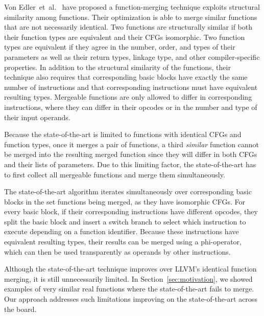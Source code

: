 Von Edler~et~al.~\cite{edler14} have proposed a function-merging technique exploits structural similarity among functions.
Their optimization is able to merge similar functions that are not necessarily
identical.
Two functions are structurally similar if both their function types are equivalent
and their CFGs isomorphic.
Two function types are equivalent if they agree in the number, order, and types
of their parameters as well as
their return types, linkage type, and other compiler-specific properties.
In addition to the structural similarity of the functions, their technique also
requires that corresponding basic blocks have exactly the same number of instructions
and that corresponding instructions must have equivalent resulting types.
Mergeable functions are only allowed to differ in corresponding instructions,
where they can differ in their opcodes or in the number and type of their input operands.


Because the state-of-the-art is limited to functions with identical CFGs
and function types, once it merges a pair of functions, a third
\textit{similar} function cannot be merged into the resulting merged function
since they will differ in both CFGs and their lists of parameters.
Due to this limiting factor, the state-of-the-art has to first collect all
mergeable functions and merge them simultaneously.

The state-of-the-art algorithm iterates simultaneously over corresponding basic
blocks in the set functions being merged, as they have isomorphic CFGs.
For every basic block, if their corresponding instructions have different opcodes,
they split the basic block and insert a switch branch to select which instruction
to execute depending on a function identifier.
Because these instructions have equivalent resulting types, their results can be
merged using a phi-operator, which can then be used transparently as operands
by other instructions.

Although the state-of-the-art technique improves over LLVM's identical function merging, it is
still unnecessarily limited. In Section~\ref{sec:motivation}, we showed examples of very similar
real functions where the state-of-the-art fails to merge. Our approach addresses such limitations
improving on the state-of-the-art across the board.


